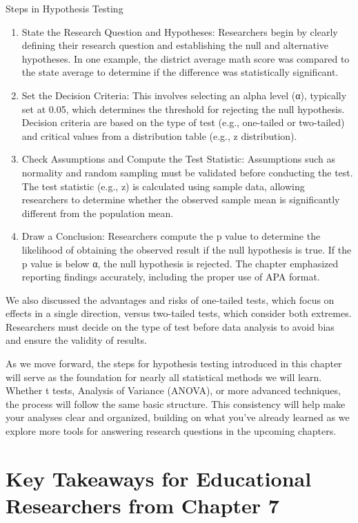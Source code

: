 \documentclass[
  letterpaper,
  DIV=11,
  numbers=noendperiod]{scrreprt}
\begin{document}
Steps in Hypothesis Testing

\begin{enumerate}
\def\labelenumi{\arabic{enumi}.}
\item
  State the Research Question and Hypotheses: Researchers begin by
  clearly defining their research question and establishing the null and
  alternative hypotheses. In one example, the district average math
  score was compared to the state average to determine if the difference
  was statistically significant.
\item
  Set the Decision Criteria: This involves selecting an alpha level (α),
  typically set at 0.05, which determines the threshold for rejecting
  the null hypothesis. Decision criteria are based on the type of test
  (e.g., one-tailed or two-tailed) and critical values from a
  distribution table (e.g., z distribution).
\item
  Check Assumptions and Compute the Test Statistic: Assumptions such as
  normality and random sampling must be validated before conducting the
  test. The test statistic (e.g., z) is calculated using sample data,
  allowing researchers to determine whether the observed sample mean is
  significantly different from the population mean.
\item
  Draw a Conclusion: Researchers compute the p value to determine the
  likelihood of obtaining the observed result if the null hypothesis is
  true. If the p value is below α, the null hypothesis is rejected. The
  chapter emphasized reporting findings accurately, including the proper
  use of APA format.
\end{enumerate}

We also discussed the advantages and risks of one-tailed tests, which
focus on effects in a single direction, versus two-tailed tests, which
consider both extremes. Researchers must decide on the type of test
before data analysis to avoid bias and ensure the validity of results.

As we move forward, the steps for hypothesis testing introduced in this
chapter will serve as the foundation for nearly all statistical methods
we will learn. Whether t tests, Analysis of Variance (ANOVA), or more
advanced techniques, the process will follow the same basic structure.
This consistency will help make your analyses clear and organized,
building on what you've already learned as we explore more tools for
answering research questions in the upcoming chapters.

\section*{Key Takeaways for Educational Researchers from Chapter
7}\label{key-takeaways-for-educational-researchers-from-chapter-7}
\end{document}

